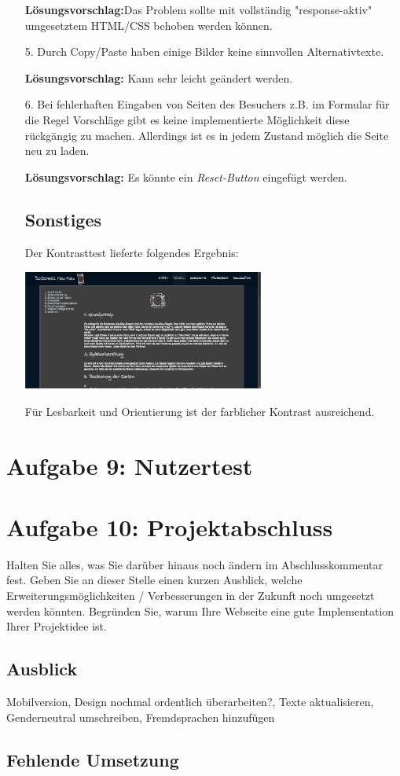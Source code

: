 \documentclass{scrartcl}
\begin{document}
\begin{itemize}
\textbf{Lösungsvorschlag:}Das Problem sollte mit vollständig "response-aktiv" umgesetztem HTML/CSS behoben werden können.

\item[5.]Durch Copy/Paste haben einige Bilder keine sinnvollen Alternativtexte.

\textbf{Lösungsvorschlag:} Kann sehr leicht geändert werden.

\item[6.] Bei fehlerhaften Eingaben von Seiten des Besuchers z.B. im Formular für die Regel Vorschläge gibt es keine implementierte Möglichkeit diese rückgängig zu machen. Allerdings ist es in jedem Zustand möglich die Seite neu zu laden.

\textbf{Lösungsvorschlag:} Es könnte ein \textit{Reset-Button} eingefügt werden. 

\subsection{Sonstiges}

Der Kontrasttest lieferte folgendes Ergebnis:

\includegraphics[width=300px, height=150px]{contrast.png}

Für Lesbarkeit und Orientierung ist der farblicher Kontrast ausreichend.



\end{itemize}



\section*{Aufgabe 9: Nutzertest}
\section*{Aufgabe 10: Projektabschluss}
 Halten Sie alles, was Sie darüber hinaus noch ändern im Abschlusskommentar fest. Geben Sie
an dieser Stelle einen kurzen Ausblick, welche Erweiterungsmöglichkeiten / Verbesserungen in
der Zukunft noch umgesetzt werden könnten. Begründen Sie, warum Ihre Webseite eine gute
Implementation Ihrer Projektidee ist.
 \subsection*{Ausblick} 
 Mobilversion, Design nochmal ordentlich überarbeiten?, Texte aktualisieren, Genderneutral umschreiben, Fremdsprachen hinzufügen
 \subsection*{Fehlende Umsetzung}
\end{document}
